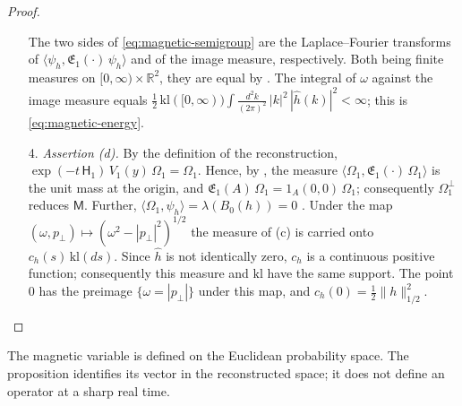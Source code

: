 \documentclass[11pt]{amsart}
\theoremstyle{definition}
\begin{document}
\begin{proof}
\begin{enumerate}
The two sides of \eqref{eq:magnetic-semigroup} are the Laplace--Fourier transforms of $\langle\psi_h,\mathfrak E_1(\cdot)\,\psi_h\rangle$ \cite[Lemma~12.18\,(b)]{QEDII} and of the image measure, respectively.
Both being finite measures on $[0,\infty)\times\mathbb R^2$, they are equal by \cite[Lemma~12.25]{QEDII}.
The integral of $\omega$ against the image measure equals $\frac12\,\allowbreak \mathrm{kl}([0,\allowbreak \infty))\int\frac{d^2k}{(2\pi)^2}\,\allowbreak |k|^2\,\allowbreak |\hat h(k)|^2<\infty$; this is \eqref{eq:magnetic-energy}.
\item[4.] \emph{Assertion (d).}
By the definition of the reconstruction, $\exp(-t\,\mathsf H_1)\,V_1(y)\,\Omega_1=\Omega_1$.
Hence, by \cite[Lemma~12.25]{QEDII}, the measure $\langle\Omega_1,\mathfrak E_1(\cdot)\,\Omega_1\rangle$ is the unit mass at the origin, and $\mathfrak E_1(A)\,\Omega_1=1_A(0,0)\,\Omega_1$; consequently $\Omega_1^\perp$ reduces $\mathsf M$.
Further, $\langle\Omega_1,\psi_h\rangle=\lambda(B_0(h))=0$ \cite[Lemma~14.3\,(a)]{QEDII}.
Under the map $(\omega,p_\perp)\mapsto(\omega^2-|p_\perp|^2)^{1/2}$ the measure of (c) is carried onto $c_h(s)\,\mathrm{kl}(ds)$.
Since $\hat h$ is not identically zero, $c_h$ is a continuous positive function; consequently this measure and $\mathrm{kl}$ have the same support.
The point $0$ has the preimage $\{\omega=|p_\perp|\}$ under this map, and $c_h(0)=\frac12\|h\|_{1/2}^2$.
\end{enumerate}
\end{proof}

The magnetic variable is defined on the Euclidean probability space.
The proposition identifies its vector in the reconstructed space; it
does not define an operator at a sharp real time.
\end{document}
